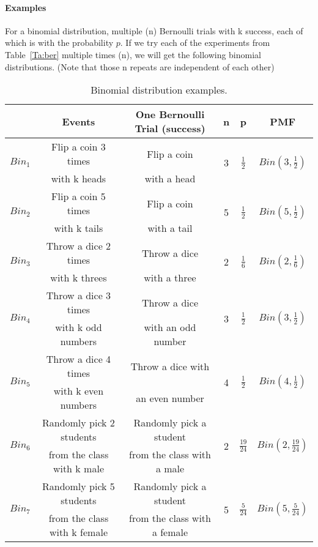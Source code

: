 \documentclass{article} %
\begin{document}
\paragraph*{Examples} For a binomial distribution, multiple (n) Bernoulli trials with k success, each of which is with the probability $p$. If we try each of the experiments from Table~\ref{Ta:ber} multiple times (n), we will get the following binomial distributions. (Note that those n repeats are independent of each other)
\begin{table}[h!]
\begin{center}
\renewcommand{\arraystretch}{1.5}
\begin{tabular}{|c|c|c|c|c|c|} \hline
& Events & One Bernoulli Trial (success) & n & p & PMF \\ \hline
\multirow{2}{*}{$Bin_1$} & {Flip a coin 3 times} & {Flip a coin} & \multirow{2}{*}{3} & \multirow{2}{*}{$\frac{1}{2}$} & \multirow{2}{*}{$Bin(3,\frac{1}{2})$} \\
& with k heads & with a head & & & \\  \hline
\multirow{2}{*}{$Bin_2$} & {Flip a coin 5 times} & {Flip a coin} & \multirow{2}{*}{5} & \multirow{2}{*}{$\frac{1}{2}$} & \multirow{2}{*}{$Bin(5,\frac{1}{2})$} \\
&  with k tails & with a tail & & & \\  \hline
\multirow{2}{*}{$Bin_3$} & {Throw a dice 2 times} & {Throw a dice} & \multirow{2}{*}{2} & \multirow{2}{*}{$\frac{1}{6}$} & \multirow{2}{*}{$Bin(2,\frac{1}{6})$} \\
&  with k threes &  with a three & & & \\ \hline
\multirow{2}{*}{$Bin_4$} & {Throw a dice 3 times}  & {Throw a dice} & \multirow{2}{*}{3} & \multirow{2}{*}{$\frac{1}{2}$} & \multirow{2}{*}{$Bin(3,\frac{1}{2})$} \\
& with k odd numbers &  with an odd number  & & & \\ \hline
\multirow{2}{*}{$Bin_5$} & {Throw a dice 4 times} & {Throw a dice with} & \multirow{2}{*}{4} & \multirow{2}{*}{$\frac{1}{2}$} & \multirow{2}{*}{$Bin(4,\frac{1}{2})$} \\
&  with k even numbers  & an even number & & & \\ \hline
\multirow{2}{*}{$Bin_6$} & {Randomly pick 2 students} & {Randomly pick a student}& \multirow{2}{*}{2} & \multirow{2}{*}{$\frac{19}{24}$} & \multirow{2}{*}{$Bin(2,\frac{19}{24})$} \\
&  from the class with k male &  from the class with a male  & & & \\ \hline
\multirow{2}{*}{$Bin_7$} & {Randomly pick 5 students}  & {Randomly pick a student}& \multirow{2}{*}{5} & \multirow{2}{*}{$\frac{5}{24}$} & \multirow{2}{*}{$Bin(5,\frac{5}{24})$} \\
& from the class with k female &  from the class with a female  & & & \\
\hline
\end{tabular}
\caption{Binomial distribution examples.}
\label{Ta:bin}
\end{center}
\end{table}
\end{document}
